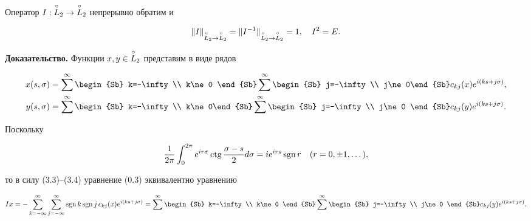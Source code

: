 \begin{cornonum}


Оператор $I:\overset{\circ}{L}{}_2\to \overset{\circ}{L}{}_2$ непрерывно обратим и 


\begin{equation}


\|I\|_{\cL\to \cL} = \|I^{-1}\|_{\cL\to\cL} = 1,\quad I^2=E.


\end{equation}


\end{cornonum}





{\bf Доказательство.} Функции $x,y \in \overset{\circ}{L}{}_2$ представим в виде рядов


\begin{align}


x(s,\sigma) &= \sum^\infty\begin{Sb} k=-\infty \\ k\ne 0 \end{Sb}


\sum^\infty\begin{Sb} j=-\infty \\ j\ne 0\end{Sb}


c_{kj}(x)e^{i(ks+j\sigma)}, \\


%


y(s,\sigma)&=\sum^\infty\begin{Sb} k=-\infty\\ k\ne 0\end{Sb}


\sum^\infty\begin{Sb} j=-\infty \\ j\ne 0 \end{Sb}


c_{kj}(y)e^{i(ks+j\sigma)}.


\end{align}


Поскольку 


$$


\frac{1}{2\pi}\int_{0}^{2\pi}e^{ir\sigma}\ctg\frac{\sigma-s}{2}d\sigma =


i e^{irs}\sgn r\quad(r=0,\pm1,\dotsc),


$$


то в силу (3.3)--(3.4) уравнение (0.3) эквивалентно уравнению


\begin{equation}


Ix = -\suml_{k=-\infty}^{\infty}\suml_{j=-\infty}^{\infty}


\sgn k \sgn j\, c_{kj}(x)e^{i(ks+j\sigma)}=


\sum^\infty\begin{Sb} k=-\infty \\ k\ne 0 \end{Sb}


\sum^\infty\begin{Sb} j=-\infty \\ j\ne 0 \end{Sb}


c_{kj}(y)e^{i(ks+j\sigma)}.


\end{equation}


